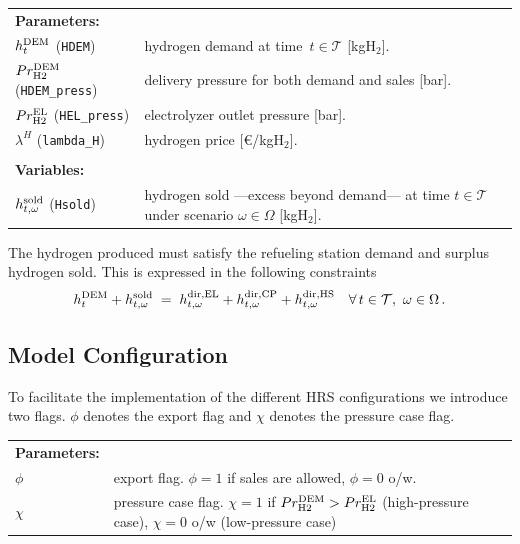 \documentclass{article}
\begin{document}
\noindent
\begin{tabularx}{\textwidth}{@{}l X@{}}  
  \textbf{Parameters:} & \\
  $h^{\rm DEM}_{t}$ (\verb|HDEM|)
    & hydrogen demand at time~$t\in\mathcal{T}$ [kgH$_2$]. \\
  $Pr^{\rm DEM}_{\rm H2}$ (\verb|HDEM_press|)
    & delivery pressure for both demand and sales [bar]. \\
  $Pr^{\rm EL}_{\rm H2}$ (\verb|HEL_press|)
    & electrolyzer outlet pressure [bar]. \\
  $\lambda^{H}$ (\verb|lambda_H|)
    & hydrogen price [\euro{}/kgH$_2$]. \\
  \\

  \textbf{Variables:} & \\
  $h^{\rm sold}_{t,\omega}$ (\verb|Hsold|)
    & hydrogen sold ---excess beyond demand--- at time $t \in \mathcal{T}$
      under scenario $\omega \in \Omega$ [kgH$_2$]. \\
\end{tabularx}

\medskip

The hydrogen produced must satisfy the refueling station demand and surplus hydrogen sold. This is expressed in the following constraints
\begin{equation}
\label{EQ:H2_demand_balance}
  h^{\rm DEM}_{t}
  + h^{\rm sold}_{t,\omega}
  \;=\;
  h^{\rm dir,EL}_{t,\omega}
  + h^{\rm dir,CP}_{t,\omega}
  + h^{\rm dir,HS}_{t,\omega}
  \quad\forall\,t\in\mathcal{T},\ \omega\in\Omega\,.
\end{equation}

\subsection{Model Configuration}
\label{SEC:ModelConfiguration}

To facilitate the implementation of the different HRS configurations we introduce two flags. $\phi$ denotes the export flag and $\chi$ denotes the pressure case flag.

\noindent
\begin{tabularx}{\textwidth}{@{}l X@{}}
  \textbf{Parameters:} & \\
      $\phi$ & export flag. $\phi = 1 $ if sales are allowed, $\phi = 0$ o/w. \\
      $\chi$ & pressure case flag. $\chi = 1$ if $Pr^{\rm DEM}_{\rm H2} > Pr^{\rm EL}_{\rm H2}$ (high-pressure case), $\chi = 0$ o/w (low-pressure case) \\
\end{tabularx}
\end{document}
